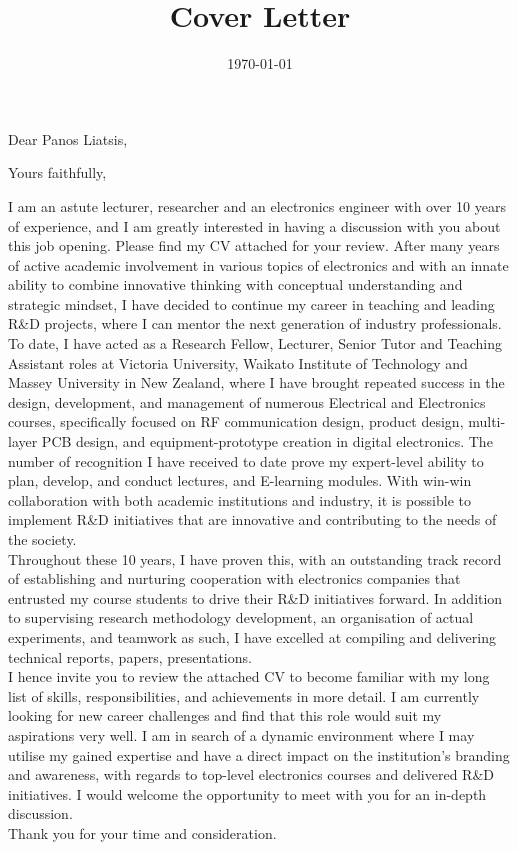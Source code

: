 \documentclass[11pt,a4paper,sans]{moderncv}        %
\title{Cover Letter}                               %
\begin{document}
\date{\today}
\opening{Dear Panos Liatsis,}
\closing{Yours faithfully,}
\makelettertitle

I am an astute lecturer, researcher  and an electronics engineer with over 10 years of experience, and I am greatly interested in having a discussion with you about this job opening. Please find my CV attached for your review. After many years of active academic involvement in various topics of electronics and with an innate ability to combine innovative thinking with conceptual understanding and strategic mindset, I have decided to continue my career in teaching and leading R\&D projects, where I can mentor the next generation of industry professionals. To date, I have acted as a Research Fellow, Lecturer, Senior Tutor and Teaching Assistant roles at Victoria University, Waikato Institute of Technology and Massey University in New Zealand, where I have brought repeated success in the design, development, and management of numerous Electrical and Electronics courses, specifically focused on RF communication design, product design, multi-layer PCB design, and equipment-prototype creation in digital electronics. The number of recognition I have received to date prove my expert-level ability to plan, develop, and conduct lectures, and E-learning modules. With win-win collaboration with both academic institutions and industry, it is possible to implement R\&D initiatives that are innovative and contributing to the needs of the society.
\\Throughout these 10 years, I have proven this, with an outstanding track record of establishing and nurturing cooperation with electronics companies that entrusted my course students to drive their R\&D initiatives forward. In addition to supervising research methodology development, an organisation of actual experiments, and teamwork as such, I have excelled at compiling and delivering technical reports, papers, presentations. \\I hence invite you to review the attached CV to become familiar with my long list of skills, responsibilities, and achievements in more detail. I am currently looking for new career challenges and find that this role would suit my aspirations very well. I am in search of a dynamic environment where I may utilise my gained expertise and have a direct impact on the institution’s branding and awareness, with regards to top-level electronics courses and delivered R\&D initiatives. I would welcome the opportunity to meet with you for an in-depth discussion.\\
Thank you for your time and consideration.



\makeletterclosing
\end{document}
